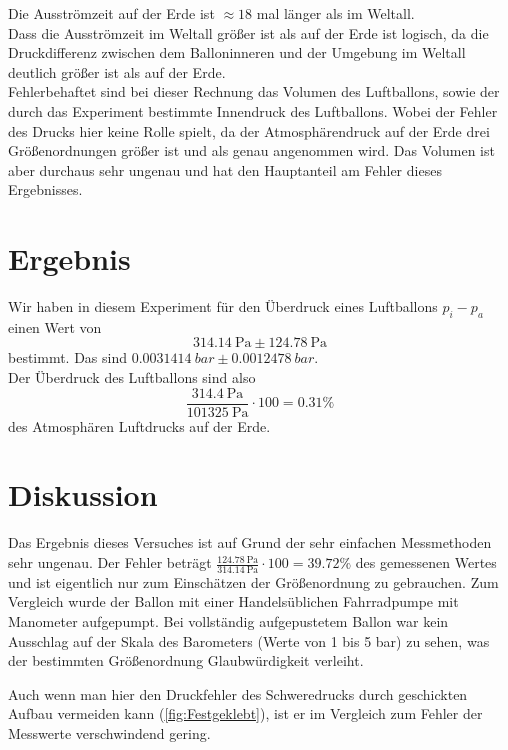 \documentclass{article}
\begin{document}
        Die Ausströmzeit auf der Erde ist \(\approx 18\) mal länger als im Weltall. \\
        Dass die Ausströmzeit im Weltall größer ist als auf der Erde ist logisch, da die Druckdifferenz zwischen dem Balloninneren und der Umgebung
        im Weltall deutlich größer ist als auf der Erde. \\
        Fehlerbehaftet sind bei dieser Rechnung das Volumen des Luftballons, sowie der durch das Experiment bestimmte Innendruck des Luftballons.
        Wobei der Fehler des Drucks hier keine Rolle spielt, da der Atmosphärendruck auf der Erde drei Größenordnungen größer ist und als genau angenommen wird.
        Das Volumen ist aber durchaus sehr ungenau und hat den Hauptanteil am Fehler dieses Ergebnisses.
    
    \section{Ergebnis}
        Wir haben in diesem Experiment für den Überdruck eines Luftballons \(p_i - p_a\) einen Wert von
        \[ \SI{314.14}{\pascal} \pm \SI{124.78}{\pascal} \]
        bestimmt.
        Das sind \( \SI{0.0031414}{bar} \pm \SI{0.0012478}{bar} \).\\
        Der Überdruck des Luftballons sind also
        \[ \frac{\SI{314.4}{\pascal}}{\SI{101325}{\pascal}} \cdot 100 = 0.31\% \] des Atmosphären Luftdrucks auf der Erde.

    \section{Diskussion}
        Das Ergebnis dieses Versuches ist auf Grund der sehr einfachen Messmethoden sehr ungenau. Der Fehler beträgt \(\frac{\SI{124.78}{\pascal}}{\SI{314.14}{\pascal} } \cdot 100 = 39.72\% \)
        des gemessenen Wertes und ist eigentlich nur zum Einschätzen der Größenordnung zu gebrauchen.
        Zum Vergleich wurde der Ballon mit einer Handelsüblichen Fahrradpumpe mit Manometer aufgepumpt. Bei vollständig aufgepustetem Ballon war kein Ausschlag auf der Skala des Barometers (Werte von 1 bis 5 bar)
        zu sehen, was der bestimmten Größenordnung Glaubwürdigkeit verleiht.

        Auch wenn man hier den Druckfehler des Schweredrucks durch geschickten Aufbau vermeiden kann (\ref{fig:Festgeklebt}), ist er im Vergleich zum Fehler der Messwerte verschwindend gering.
\end{document}
